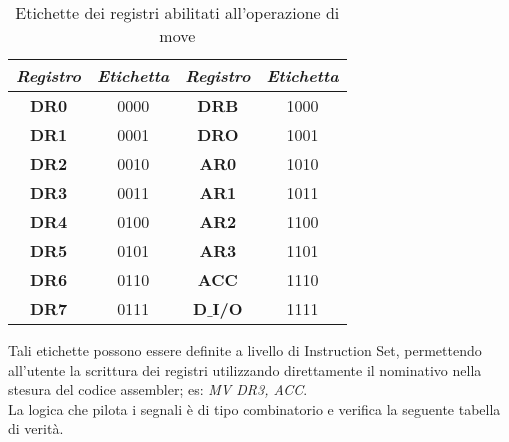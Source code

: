 \begin{table}[H]
	\centering
	\fontsize{10}{18}\selectfont
	\begin{tabular}{|p{25mm}|p{25mm}|p{25mm}|p{25mm}|}
		\hline
		\multicolumn{1}{|c|}{\textit{Registro}} &
		\multicolumn{1}{c|}{\textit{Etichetta}} &
		\multicolumn{1}{|c|}{\textit{Registro}} &
		\multicolumn{1}{c|}{\textit{Etichetta}}\\
		
		\hline
		\multicolumn{1}{|c|}{\textbf{DR0}} &
		\multicolumn{1}{c|}{0000} &
		\multicolumn{1}{|c|}{\textbf{DRB}} &
		\multicolumn{1}{c|}{1000}\\
		
		\hline
		\multicolumn{1}{|c|}{\textbf{DR1}} &
		\multicolumn{1}{c|}{0001} &
		\multicolumn{1}{|c|}{\textbf{DRO}} &
		\multicolumn{1}{c|}{1001}\\
		
		\hline
		\multicolumn{1}{|c|}{\textbf{DR2}} &
		\multicolumn{1}{c|}{0010} &
		\multicolumn{1}{|c|}{\textbf{AR0}} &
		\multicolumn{1}{c|}{1010}\\
		
		\hline
		\multicolumn{1}{|c|}{\textbf{DR3}} &
		\multicolumn{1}{c|}{0011} &
		\multicolumn{1}{|c|}{\textbf{AR1}} &
		\multicolumn{1}{c|}{1011}\\
		
		\hline
		\multicolumn{1}{|c|}{\textbf{DR4}} &
		\multicolumn{1}{c|}{0100} &
		\multicolumn{1}{|c|}{\textbf{AR2}} &
		\multicolumn{1}{c|}{1100}\\
		
		\hline
		\multicolumn{1}{|c|}{\textbf{DR5}} &
		\multicolumn{1}{c|}{0101} &
		\multicolumn{1}{|c|}{\textbf{AR3}} &
		\multicolumn{1}{c|}{1101}\\
		
		\hline
		\multicolumn{1}{|c|}{\textbf{DR6}} &
		\multicolumn{1}{c|}{0110} &
		\multicolumn{1}{|c|}{\textbf{ACC}} &
		\multicolumn{1}{c|}{1110}\\
		
		\hline
		\multicolumn{1}{|c|}{\textbf{DR7}} &
		\multicolumn{1}{c|}{0111} &
		\multicolumn{1}{|c|}{\textbf{D$\_$I/O}} &
		\multicolumn{1}{c|}{1111}\\
		
		\hline
	\end{tabular}
	\caption{Etichette dei registri abilitati all'operazione di move}
\end{table}
\noindent
Tali etichette possono essere definite a livello di Instruction Set, permettendo all'utente la scrittura dei registri utilizzando direttamente il nominativo nella stesura del codice assembler; es: \textit{MV DR3, ACC}.\\
La logica che pilota i segnali è di tipo combinatorio e verifica la seguente tabella di verità.

